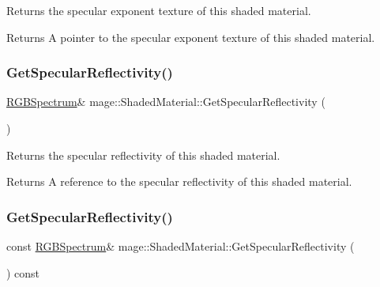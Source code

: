 Returns the specular exponent texture of this shaded material.

\begin{DoxyReturn}{Returns}
A pointer to the specular exponent texture of this shaded material. 
\end{DoxyReturn}
\hypertarget{structmage_1_1_shaded_material_aa13cf6b1af3568471ebd0f93a0bc08ac}{}\label{structmage_1_1_shaded_material_aa13cf6b1af3568471ebd0f93a0bc08ac} 
\subsubsection{\texorpdfstring{Get\+Specular\+Reflectivity()}{GetSpecularReflectivity()}\hspace{0.1cm}{\footnotesize\ttfamily [1/2]}}
{\footnotesize\ttfamily \hyperlink{structmage_1_1_r_g_b_spectrum}{R\+G\+B\+Spectrum}\& mage\+::\+Shaded\+Material\+::\+Get\+Specular\+Reflectivity (\begin{DoxyParamCaption}{ }\end{DoxyParamCaption})\hspace{0.3cm}{\ttfamily [noexcept]}}

Returns the specular reflectivity of this shaded material.

\begin{DoxyReturn}{Returns}
A reference to the specular reflectivity of this shaded material. 
\end{DoxyReturn}
\hypertarget{structmage_1_1_shaded_material_a7655315b6654ee4f6f34ac2489ee6f92}{}\label{structmage_1_1_shaded_material_a7655315b6654ee4f6f34ac2489ee6f92} 
\subsubsection{\texorpdfstring{Get\+Specular\+Reflectivity()}{GetSpecularReflectivity()}\hspace{0.1cm}{\footnotesize\ttfamily [2/2]}}
{\footnotesize\ttfamily const \hyperlink{structmage_1_1_r_g_b_spectrum}{R\+G\+B\+Spectrum}\& mage\+::\+Shaded\+Material\+::\+Get\+Specular\+Reflectivity (\begin{DoxyParamCaption}{ }\end{DoxyParamCaption}) const\hspace{0.3cm}{\ttfamily [noexcept]}}


